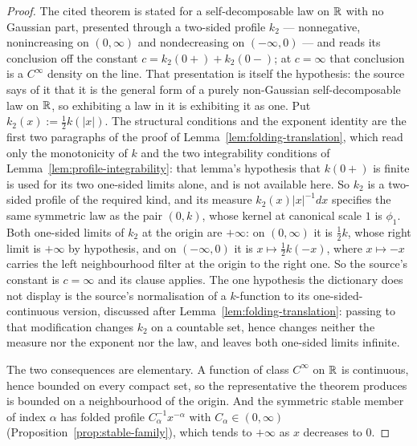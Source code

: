 \begin{proof}
The cited theorem is stated for a self-decomposable law on $\mathbb{R}$ with no Gaussian part, presented
through a two-sided profile $k_2$ --- nonnegative, nonincreasing on $(0,\infty)$ and
nondecreasing on $(-\infty,0)$ --- and reads its conclusion off the constant
$c = k_2(0{+}) + k_2(0{-})$; at $c = \infty$ that conclusion is a $C^\infty$ density on the line.
That presentation is itself the hypothesis: the source says of it that it is the general form of
a purely non-Gaussian self-decomposable law on $\mathbb{R}$, so exhibiting a law in it is exhibiting it
as one.
Put $k_2(x) := \tfrac12 k(|x|)$. The structural conditions and the exponent identity are the
first two paragraphs of the proof of Lemma~\ref{lem:folding-translation}, which read only the
monotonicity of $k$ and the two integrability conditions of
Lemma~\ref{lem:profile-integrability}: that lemma's hypothesis that $k(0{+})$ is finite is used
for its two one-sided limits alone, and is not available here. So $k_2$ is a two-sided profile of
the required kind, and its \Levy{} measure $k_2(x)|x|^{-1}dx$ specifies the same symmetric law as
the pair $(0,k)$, whose kernel at canonical scale $1$ is $\phi_1$. Both one-sided limits of $k_2$
at the origin are $+\infty$: on $(0,\infty)$ it is $\tfrac12k$, whose right limit is $+\infty$ by
hypothesis, and on $(-\infty,0)$ it is $x \mapsto \tfrac12k(-x)$, where $x \mapsto -x$ carries the
left neighbourhood filter at the origin to the right one. So the source's constant is $c = \infty$
and its clause applies. The one hypothesis the dictionary does not display is the source's
normalisation of a $k$-function to its one-sided-continuous version, discussed after
Lemma~\ref{lem:folding-translation}: passing to that modification changes $k_2$ on a countable set,
hence changes neither the \Levy{} measure nor the exponent nor the law, and leaves both one-sided
limits infinite.

The two consequences are elementary. A function of class $C^\infty$ on $\mathbb{R}$ is continuous, hence
bounded on every compact set, so the representative the theorem produces is bounded on a
neighbourhood of the origin. And the symmetric stable member of index $\alpha$ has folded profile
$C_\alpha^{-1}x^{-\alpha}$ with $C_\alpha \in (0,\infty)$
(Proposition~\ref{prop:stable-family}), which tends to $+\infty$ as $x$ decreases to $0$.
\end{proof}
